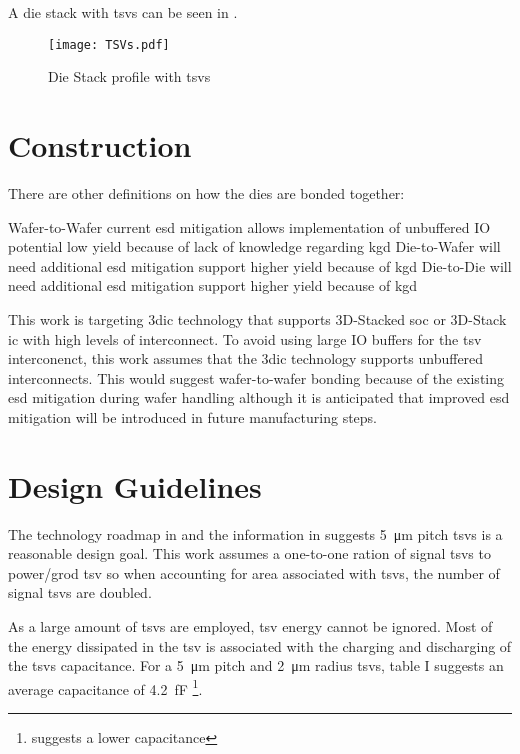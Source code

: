 A die stack with \acp{tsv} can be seen in .

\begin{figure}[h]
\centering
\captionsetup{justification=centering}
\captionsetup{width=.9\linewidth}
\centerline{
\mbox{\texttt{[image: TSVs.pdf]}}
}
\caption{Die Stack profile \cite{itrs2015_interconn} with \acp{tsv}}
\label{fig:tsv}
\end{figure}

\section{Construction}
\label{sec:3dic construction}

There are other definitions on how the dies are bonded together:
\begin{outline}
  \1 Wafer-to-Wafer
    \2 current \ac{esd} mitigation allows implementation of unbuffered IO
    \2 potential low yield because of lack of knowledge regarding \ac{kgd}
  \1 Die-to-Wafer
    \2 will need additional \ac{esd} mitigation support
    \2 higher yield because of \ac{kgd}
  \1 Die-to-Die
    \2 will need additional \ac{esd} mitigation support
    \2 higher yield because of \ac{kgd}
\end{outline}

This work is targeting \ac{3dic} technology that supports 3D-Stacked \ac{soc} or 3D-Stack \ac{ic} with high levels of interconnect.
To avoid using large IO buffers for the \ac{tsv} interconenct, this work assumes that the \ac{3dic} technology supports unbuffered interconnects. 
This would suggest wafer-to-wafer bonding because of the existing \ac{esd} mitigation during wafer handling although it is anticipated that improved \ac{esd} mitigation will be introduced in future manufacturing steps.

\section{Design Guidelines}
\label{sec:3dic Design Guidelines}

The technology roadmap in \cite{itrs2015_interconn} and the information in \cite{patti2014} suggests \SI{5}{\micro\meter} pitch \acp{tsv} is a reasonable design goal. This work assumes a one-to-one ration of signal \acp{tsv} to power/grod \ac{tsv} so when accounting for area associated with \acp{tsv}, the number of signal \acp{tsv} are doubled.

As a large amount of \acp{tsv} are employed, \ac{tsv} energy cannot be ignored.
Most of the energy dissipated in the \ac{tsv} is associated with the charging and discharging of the \acp{tsv} capacitance. For a \SI{5}{\micro\meter} pitch and \SI{2}{\micro\meter} radius \acp{tsv}, \cite{Bamberg2017} table I suggests an average capacitance of \SI{4.2}{\femto\farad} \footnote{\cite{tezzaron:preso} suggests a lower capacitance}.

